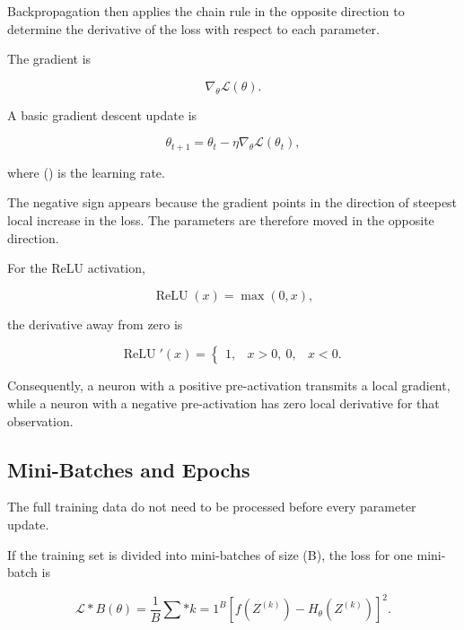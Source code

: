 \documentclass[12pt,a4paper]{report}
\begin{document}
Backpropagation then applies the chain rule in the opposite direction to determine the derivative of the loss with respect to each parameter.

The gradient is

\begin{equation}
\nabla_\theta
\mathcal{L}(\theta).
\end{equation}

A basic gradient descent update is

\begin{equation}
\theta_{t+1}
=
\theta_t
-
\eta
\nabla_\theta
\mathcal{L}(\theta_t),
\end{equation}

where (\eta) is the learning rate.

The negative sign appears because the gradient points in the direction of steepest local increase in the loss. The parameters are therefore moved in the opposite direction.

For the ReLU activation,

\begin{equation}
\operatorname{ReLU}(x)
=
\max(0,x),
\end{equation}

the derivative away from zero is

\begin{equation}
\operatorname{ReLU}'(x)
=
\begin{cases}
1, & x>0,\
0, & x<0.
\end{cases}
\end{equation}

Consequently, a neuron with a positive pre-activation transmits a local gradient, while a neuron with a negative pre-activation has zero local derivative for that observation.

\subsection{Mini-Batches and Epochs}

The full training data do not need to be processed before every parameter update.

If the training set is divided into mini-batches of size (B), the loss for one mini-batch is

\begin{equation}
\mathcal{L}*B(\theta)
=
\frac{1}{B}
\sum*{k=1}^{B}
\left[
f(Z^{(k)})
-
H_\theta(Z^{(k)})
\right]^2.
\end{equation}
\end{document}
